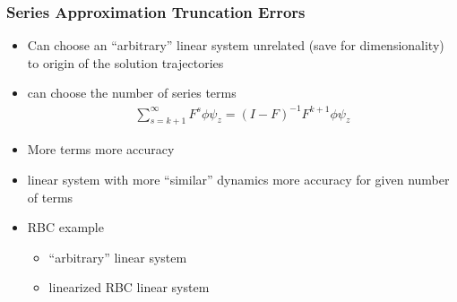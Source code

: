 \documentclass[letter]{beamer}
\begin{document}
\begin{frame}
  \frametitle{Series Approximation Truncation Errors}
  \begin{itemize}
  \item Can choose an ``arbitrary''  linear system unrelated (save for dimensionality) to origin of the solution trajectories
  \item can choose the number of series terms
    \begin{gather}
      \label{eq:1}
\sum_{s=k+1}^{\infty} F^s \phi \psi_z = (I -F)^{-1} F^{k+1}\phi \psi_z       
    \end{gather}
  \item More terms more accuracy
  \item linear system with more ``similar'' dynamics more accuracy for given number of terms
  \item RBC example
    \begin{itemize}
    \item ``arbitrary'' linear system

  \item linearized RBC  linear system

    \end{itemize}

  \end{itemize}
\end{frame}
\end{document}
